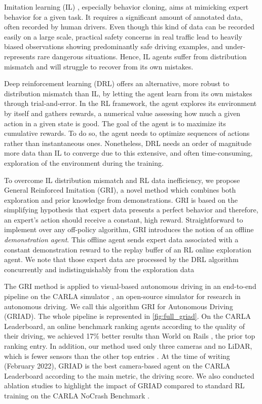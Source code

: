 \documentclass[letterpaper, 10 pt, conference]{ieeeconf}
\begin{document}
Imitation learning (IL) \cite{bojarski, il-bullshit, transfuser, marin-fisheye}, especially behavior cloning, aims at mimicking expert behavior for a given task. It requires a significant amount of annotated data, often recorded by human drivers. Even though this kind of data can be recorded easily on a large scale, practical safety concerns in real traffic lead to heavily biased observations showing predominantly safe driving examples, and under-represents rare dangerous situations. Hence, IL agents suffer from distribution mismatch and will struggle to recover from its own mistakes.

Deep reinforcement learning (DRL) \cite{dqn, ppo, td3, a3c} offers an alternative, more robust to distribution mismatch than IL, by letting the agent learn from its own mistakes through trial-and-error. In the RL framework, the agent explores its environment by itself and gathers rewards, a numerical value assessing how much a given action in a given state is good. The goal of the agent is to maximize its cumulative rewards. To do so, the agent needs to optimize sequences of actions rather than instantaneous ones.
Nonetheless, DRL needs an order of magnitude more data than IL to converge due to this extensive, and often time-consuming, exploration of the environment during the training. 

To overcome IL distribution mismatch and RL data inefficiency, we propose General Reinforced Imitation (GRI), a novel method which combines both exploration and prior knowledge from demonstrations. GRI is based on the simplifying hypothesis that expert data presents a perfect behavior and therefore, an expert's action should receive a constant, high reward. Straightforward to implement over any off-policy algorithm, GRI introduces the notion of an offline \textit{demonstration agent}. This offline agent sends expert data associated with a constant demonstration reward to the replay buffer of an RL online exploration agent. We note that those expert data are processed by the DRL algorithm concurrently and indistinguishably from the exploration data



The GRI method is applied to visual-based autonomous driving in an end-to-end pipeline on the CARLA simulator \cite{carla}, an open-source simulator for research in autonomous driving. We call this algorithm GRI for Autonomous Driving (GRIAD). The whole pipeline is represented in \cref{fig:full_griad}. On the CARLA Leaderboard, an online benchmark ranking agents according to the quality of their driving, we achieved 17\% better results than World on Rails \cite{wor}, the prior top ranking entry. In addition, our method used only three cameras and no LiDAR, which is fewer sensors than the other top entries \cite{wor, transfuser}. At the time of writing (February 2022), GRIAD is the best camera-based agent on the CARLA Leaderboard according to the main metric, the driving score. We also conducted ablation studies to highlight the impact of GRIAD compared to standard RL training on the CARLA NoCrash Benchmark \cite{nocrash}.
\end{document}
